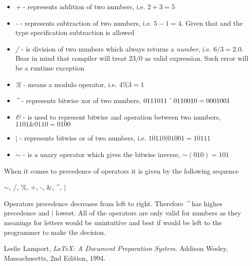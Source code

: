 \documentclass[a4wide, 11pt]{article}
\newcommand\xor{\mathbin{\char `\^}}
\begin{document}
\begin{itemize}

    \item
    \textit{+} - represents addition of two numbers, i.e. $ 2 + 3 = 5 $

    \item
    \textit{-} - represents subtraction of two numbers, i.e. $ 5 - 1 = 4 $. Given that and the type specification subtraction is allowed 

    \item
    \textit{/} - is division of two numbers which always returns a \emph{number}, i.e. $ 6 / 3 = 2.0 $. Bear in mind that compiler will treat $ 23 / 0 $ as valid expression. Such error will be a runtime exception

    \item
    \textit{\%} - means a modulo operator, i.e. $ 4 \% 3 = 1 $

    \item
    \textit{\textasciicircum{}} - represents bitwise xor of two numbers, $ 0111011 \xor  0110010 = 0001001 $

    \item
    \textit{\&} - is used to represent bitwise and operation between two numbers,  $ 1101 \& 0110 = 0100 $

    \item
    \textit{$|$} - represents bitwise or of two numbers, i.e. $ 10110 | 01001 = 10111 $

    \item
    \textit{$\sim$} - is a unary operator which gives the bitwise inverse, $ \sim(010) = 101 $
    
\end{itemize}

When it comes to precedence of operators it is given by the following sequence

\begin{center} $\sim$, /, \%, +, -, \&, \textasciicircum{}, $|$ \end{center}

Operators precedence decreases from left to right. Therefore \emph{\textasciicircum{}} has highes precedence and \emph{$|$} lowest.
All of the operators are only valid for numbers as they meanings for letters would be unintuitive and best if would be left to the programmer to make the decision.


\begin{thebibliography}{9}

  Leslie Lamport,
  \emph{\LaTeX: A Document Preparation System}.
  Addison Wesley, Massachusetts,
  2nd Edition,
  1994.

\end{thebibliography}
\end{document}
